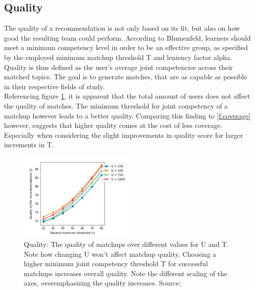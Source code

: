 \documentclass[nochapterpage,bigchapter,linedtoc,longdoc,colorback,accentcolor=tud3b,oneside]{tudreport}
\begin{document}
\subsection{Quality} \label{paper:quality}
The quality of a recommendation is not only based on its fit, but also on how good the resulting team could perform. According to Blumenfeld, learners should meet a minimum competency level in order to be an effective group, as specified by the employed minimum matchup threshold T and leniency factor alpha. \cite{blumenfeld1996learning} Quality is thus defined as the user's average joint competencies across their matched topics. The goal is to generate matches, that are as capable as possible in their respective fields of study.\\
Referencing figure \ref{f:quality}, it is apparent that the total amount of users does not affect the quality of matches. The minimum threshold for joint competency of a matchup however leads to a better quality. Comparing this finding to \ref{f:coverage} however, suggests that higher quality comes at the cost of less coverage. Especially when considering the slight improvements in quality score for larger increments in T.\\
\begin{figure}[p]
	\centering
	\includegraphics[width=0.5\textwidth]{g/QualityByU.PNG}
	\caption{Quality: The quality of matchups over different values for U and T. Note how changing U won't affect matchup quality. Choosing a higher minimum joint competency threshold T for successful matchups increases overall quality. Note the different scaling of the axes, overemphasizing the quality increases. Source: \cite{potts2018reciprocal}}
	\label{f:quality}
\end{figure}
\end{document}
